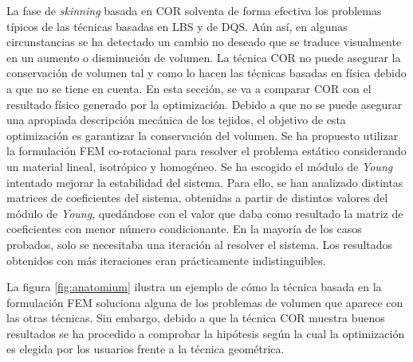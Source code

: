 La fase de \emph{skinning} basada en \ac{COR} solventa de forma efectiva los problemas típicos de las técnicas basadas en \ac{LBS} y de \ac{DQS}. Aún así, en algunas circunstancias se ha detectado un cambio no deseado que se traduce visualmente en un aumento o disminución de volumen. 
La técnica \ac{COR} no puede asegurar la conservación de volumen tal y como lo hacen las técnicas basadas en física debido a que no se tiene en cuenta. En esta sección, se va a comparar \ac{COR} con el resultado físico generado por la optimización. Debido a que no se puede asegurar una apropiada descripción mecánica de los tejidos, el objetivo de esta optimización es garantizar la conservación del volumen.  
Se ha propuesto utilizar la formulación \ac{FEM} co-rotacional para resolver el problema estático considerando un material lineal, isotrópico y homogéneo. Se ha escogido el módulo de \emph{Young}  intentado mejorar la estabilidad del sistema. Para ello, se han analizado distintas matrices de coeficientes del sistema, obtenidas a partir de distintos valores del módulo de \emph{Young}, quedándose con el valor que daba como resultado la matriz de coeficientes con menor número condicionante. En la mayoría de los casos probados, solo se necesitaba una iteración al resolver el sistema. Los resultados obtenidos con más iteraciones eran prácticamente indistinguibles. 
 

La figura \ref{fig:anatomium} ilustra un ejemplo de cómo la técnica basada en la formulación \ac{FEM} soluciona alguna de los problemas de volumen que aparece con las otras técnicas. Sin embargo, debido a que la técnica \ac{COR} muestra buenos resultados se ha procedido a comprobar la hipótesis según la cual la optimización es elegida por los usuarios frente a la técnica geométrica.
 
